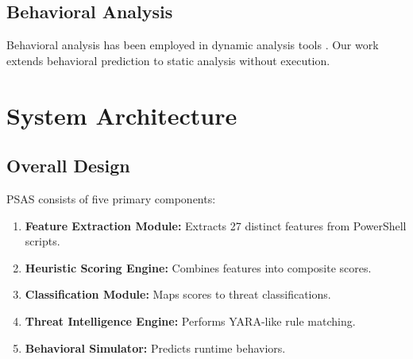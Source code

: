 \documentclass[10pt,conference,a4paper]{IEEEtran}
\begin{document}
\subsection{Behavioral Analysis}

Behavioral analysis has been employed in dynamic analysis tools \cite{ref15, ref16}. Our work extends behavioral prediction to static analysis without execution.

\section{System Architecture}

\subsection{Overall Design}

PSAS consists of five primary components:

\begin{enumerate}
\item \textbf{Feature Extraction Module:} Extracts 27 distinct features from PowerShell scripts.
\item \textbf{Heuristic Scoring Engine:} Combines features into composite scores.
\item \textbf{Classification Module:} Maps scores to threat classifications.
\item \textbf{Threat Intelligence Engine:} Performs YARA-like rule matching.
\item \textbf{Behavioral Simulator:} Predicts runtime behaviors.
\end{enumerate}
\end{document}
